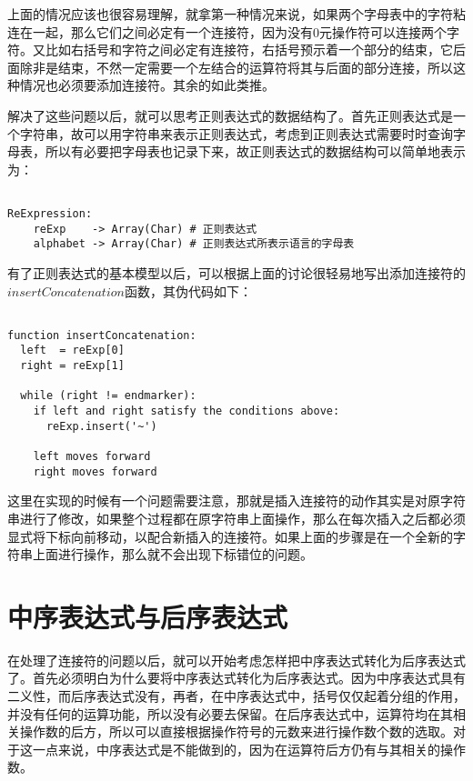 上面的情况应该也很容易理解，就拿第一种情况来说，如果两个字母表中的字符粘连在一起，那么它们之间必定有一个连接符，因为没有0元操作符可以连接两个字符。又比如右括号和字符之间必定有连接符，右括号预示着一个部分的结束，它后面除非是结束，不然一定需要一个左结合的运算符将其与后面的部分连接，所以这种情况也必须要添加连接符。其余的如此类推。   

解决了这些问题以后，就可以思考正则表达式的数据结构了。首先正则表达式是一个字符串，故可以用字符串来表示正则表达式，考虑到正则表达式需要时时查询字母表，所以有必要把字母表也记录下来，故正则表达式的数据结构可以简单地表示为：

\begin{verbatim}

ReExpression:
    reExp    -> Array(Char) # 正则表达式
    alphabet -> Array(Char) # 正则表达式所表示语言的字母表

\end{verbatim}

有了正则表达式的基本模型以后，可以根据上面的讨论很轻易地写出添加连接符的$insertConcatenation$函数，其伪代码如下：

\begin{verbatim}

function insertConcatenation:
  left  = reExp[0]
  right = reExp[1]

  while (right != endmarker):
    if left and right satisfy the conditions above:
      reExp.insert('~')

    left moves forward
    right moves forward

\end{verbatim}

这里在实现的时候有一个问题需要注意，那就是插入连接符的动作其实是对原字符串进行了修改，如果整个过程都在原字符串上面操作，那么在每次插入之后都必须显式将下标向前移动，以配合新插入的连接符。如果上面的步骤是在一个全新的字符串上面进行操作，那么就不会出现下标错位的问题。


\section{中序表达式与后序表达式}

在处理了连接符的问题以后，就可以开始考虑怎样把中序表达式转化为后序表达式了。首先必须明白为什么要将中序表达式转化为后序表达式。因为中序表达式具有二义性，而后序表达式没有，再者，在中序表达式中，括号仅仅起着分组的作用，并没有任何的运算功能，所以没有必要去保留。在后序表达式中，运算符均在其相关操作数的后方，所以可以直接根据操作符号的元数来进行操作数个数的选取。对于这一点来说，中序表达式是不能做到的，因为在运算符后方仍有与其相关的操作数。

